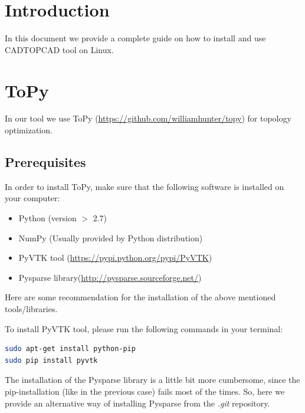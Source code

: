 \documentclass[11pt,a4paper,bibtotoc,idxtotoc,headsepline,footsepline,footexclude,DIV13,oneside]{scrbook}
\begin{document}
	\frontmatter
	
	
	
	
	
	
	
	\listoftodos
	\tableofcontents

	\mainmatter
	
	\chapter{Introduction}
	\label{intro}
	In this document we provide a complete guide on how to install and use CADTOPCAD tool on Linux.

	\chapter{ToPy}
	\label{Topy}
	In our tool we use ToPy (\href{https://github.com/williamhunter/topy}{https://github.com/williamhunter/topy}) for topology optimization. 
	\section{Prerequisites}
	\label{ToPy:sec1}
	In order to install ToPy, make sure that the following software is installed on your computer:
	\begin{itemize}
	\item Python (version $>$ 2.7)
	\item NumPy (Usually provided by Python distribution)
	\item PyVTK tool (\href{https://pypi.python.org/pypi/PyVTK}{https://pypi.python.org/pypi/PyVTK}) 
	\item Pysparse library(\href{http://pysparse.sourceforge.net/}{http://pysparse.sourceforge.net/})
	\end{itemize}
	Here are some recommendation for the installation of the above mentioned tools/libraries.
	
	To install PyVTK tool, please run the following commands in your terminal:
\begin{lstlisting}[language=bash]
sudo apt-get install python-pip
sudo pip install pyvtk
\end{lstlisting}	
	
	
	The installation of the Pysparse library is a little bit more cumbersome, since the pip-installation (like in the previous case) fails most of the times. So, here we provide an alternative way of installing Pysparse from the \textit{.git} repository.
	
\end{document}
